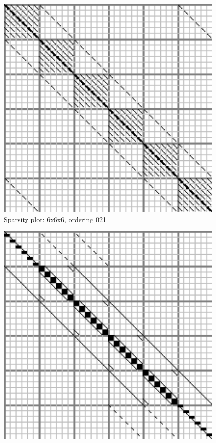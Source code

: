 \documentclass[10pt]{article}
\begin{document}
\begin{multicols}{2}
\begin{center}
\begin{minipage}[t]{.5\textwidth}
\begin{figure}[H]
	\includegraphics[width=\spwidth]{../img/sparsity/int_small_6x6x6_021.eps}
	\caption{Sparsity plot: 6x6x6, ordering 021 }
\end{figure}
\vspace{\spmgin}
\begin{figure}[H]
	\centering
	\includegraphics[width=\spwidth]{../img/sparsity/int_small_6x6x6_102.eps}

\end{figure}
\end{minipage}
\end{center}
\end{multicols}
\end{document}
